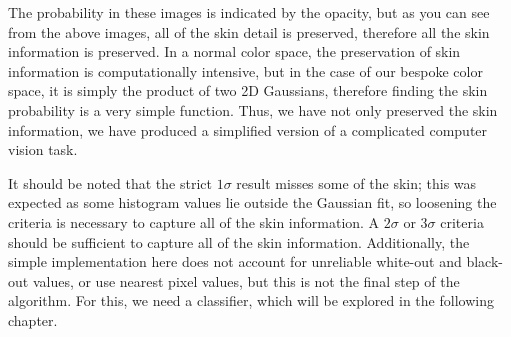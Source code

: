 The probability in these images is indicated by the opacity, but as you can see from the above images, all of the skin detail is preserved, therefore all the skin information is preserved. In a normal color space, the preservation of skin information is computationally intensive, but in the case of our bespoke color space, it is simply the product of two 2D Gaussians, therefore finding the skin probability is a very simple function. Thus, we have not only preserved the skin information, we have produced a simplified version of a complicated computer vision task. 

It should be noted that the strict $1\sigma$ result misses some of the skin; this was expected as some histogram values lie outside the Gaussian fit, so loosening the criteria is necessary to capture all of the skin information. A $2\sigma$ or $3\sigma$ criteria should be sufficient to capture all of the skin information. Additionally, the simple implementation here does not account for unreliable white-out and black-out values, or use nearest pixel values, but this is not the final step of the algorithm. For this, we need a classifier, which will be explored in the following chapter.
